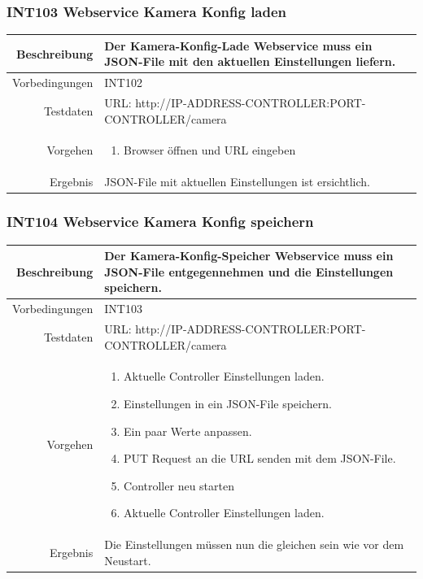 \subsubsection{INT103 Webservice Kamera Konfig laden}
\begin{table}[h!]
	\renewcommand{\arraystretch}{1.5}
	\begin{tabular}{|r|p{14cm}|}
		\hline Beschreibung & Der Kamera-Konfig-Lade Webservice muss ein JSON-File mit den aktuellen Einstellungen liefern. \\ 
		\hline Vorbedingungen & INT102 \\ 
		\hline Testdaten & URL: http://IP-ADDRESS-CONTROLLER:PORT-CONTROLLER/camera \\ 
		\hline Vorgehen & 
		\begin{enumerate}
			\item Browser öffnen und URL eingeben
		\end{enumerate} \\ 
		\hline Ergebnis & JSON-File mit aktuellen Einstellungen ist ersichtlich. \\ 
		\hline 
	\end{tabular}
\end{table}

\subsubsection{INT104 Webservice Kamera Konfig speichern}
\begin{table}[h!]
	\renewcommand{\arraystretch}{1.5}
	\begin{tabular}{|r|p{14cm}|}
		\hline Beschreibung & Der Kamera-Konfig-Speicher Webservice muss ein JSON-File entgegennehmen und die Einstellungen speichern. \\ 
		\hline Vorbedingungen & INT103 \\ 
		\hline Testdaten & URL: http://IP-ADDRESS-CONTROLLER:PORT-CONTROLLER/camera \\ 
		\hline Vorgehen & 
		\begin{enumerate}
			\item Aktuelle Controller Einstellungen laden.
			\item Einstellungen in ein JSON-File speichern.
			\item Ein paar Werte anpassen.
			\item PUT Request an die URL senden mit dem JSON-File.
			\item Controller neu starten
			\item Aktuelle Controller Einstellungen laden.
		\end{enumerate} \\ 
		\hline Ergebnis & Die Einstellungen müssen nun die gleichen sein wie vor dem Neustart. \\ 
		\hline 
	\end{tabular}
\end{table}
\newpage

